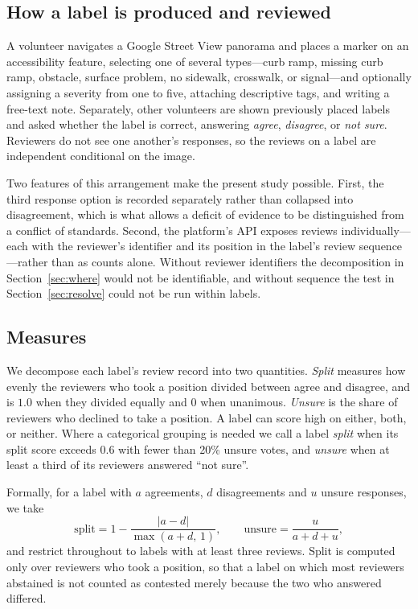 \documentclass[sigconf]{acmart}
\begin{document}
\subsection{How a label is produced and reviewed}

A volunteer navigates a Google Street View panorama and places a marker on an
accessibility feature, selecting one of several types---curb ramp, missing curb
ramp, obstacle, surface problem, no sidewalk, crosswalk, or signal---and
optionally assigning a severity from one to five, attaching descriptive tags,
and writing a free-text note. Separately, other volunteers are shown previously
placed labels and asked whether the label is correct, answering \emph{agree},
\emph{disagree}, or \emph{not sure}. Reviewers do not see one another's
responses, so the reviews on a label are independent conditional on the image.

Two features of this arrangement make the present study possible. First, the
third response option is recorded separately rather than collapsed into
disagreement, which is what allows a deficit of evidence to be distinguished
from a conflict of standards. Second, the platform's API exposes reviews
individually---each with the reviewer's identifier and its position in the
label's review sequence---rather than as counts alone. Without reviewer
identifiers the decomposition in Section~\ref{sec:where} would not be
identifiable, and without sequence the test in Section~\ref{sec:resolve} could
not be run within labels.

\subsection{Measures}

We decompose each label's review record into two quantities. \emph{Split}
measures how evenly the reviewers who took a position divided between agree and
disagree, and is $1.0$ when they divided equally and $0$ when unanimous.
\emph{Unsure} is the share of reviewers who declined to take a position. A label
can score high on either, both, or neither. Where a categorical grouping is
needed we call a label \emph{split} when its split score exceeds $0.6$ with
fewer than 20\% unsure votes, and \emph{unsure} when at least a third of its
reviewers answered ``not sure''.

Formally, for a label with $a$ agreements, $d$ disagreements and $u$ unsure
responses, we take
\[
  \mathrm{split} = 1 - \frac{|a-d|}{\max(a+d,\,1)},
  \qquad
  \mathrm{unsure} = \frac{u}{a+d+u},
\]
and restrict throughout to labels with at least three reviews. Split is
computed only over reviewers who took a position, so that a label on which most
reviewers abstained is not counted as contested merely because the two who
answered differed.
\end{document}
